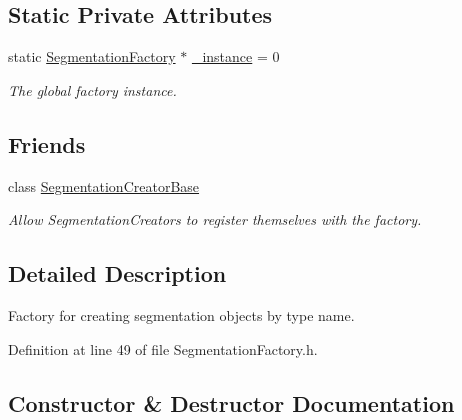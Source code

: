 \subsection*{Static Private Attributes}
\begin{DoxyCompactItemize}
\item 
static \hyperlink{class_d_d4hep_1_1_d_d_segmentation_1_1_segmentation_factory}{Segmentation\+Factory} $\ast$ \hyperlink{class_d_d4hep_1_1_d_d_segmentation_1_1_segmentation_factory_a1feb10e4594795939255eb57b80a76dd}{\+\_\+instance} = 0
\begin{DoxyCompactList}\small\item\em The global factory instance. \end{DoxyCompactList}\end{DoxyCompactItemize}
\subsection*{Friends}
\begin{DoxyCompactItemize}
\item 
class \hyperlink{class_d_d4hep_1_1_d_d_segmentation_1_1_segmentation_factory_ab25c2677f6e2445716078cc5c9e87009}{Segmentation\+Creator\+Base}
\begin{DoxyCompactList}\small\item\em Allow Segmentation\+Creators to register themselves with the factory. \end{DoxyCompactList}\end{DoxyCompactItemize}


\subsection{Detailed Description}
Factory for creating segmentation objects by type name. 

Definition at line 49 of file Segmentation\+Factory.\+h.



\subsection{Constructor \& Destructor Documentation}
\hypertarget{class_d_d4hep_1_1_d_d_segmentation_1_1_segmentation_factory_af28879ad5d0b45254c69234ec4a90fe5}{}\label{class_d_d4hep_1_1_d_d_segmentation_1_1_segmentation_factory_af28879ad5d0b45254c69234ec4a90fe5} 
